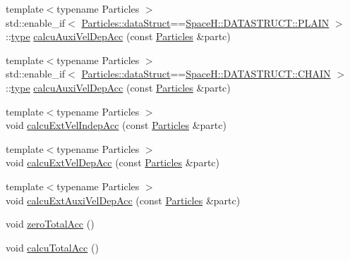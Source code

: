 \begin{DoxyCompactItemize}
\item 
{\footnotesize template$<$typename Particles $>$ }\\std\+::enable\+\_\+if$<$ \mbox{\hyperlink{class_vel_indep_particles_a6d357b21c216a2b079b1927c18de0b8f}{Particles\+::data\+Struct}}==\mbox{\hyperlink{namespace_space_h_a0af19f79a6498e99dbda772053d44a72af62eb0bf5e5c72e80983fbbac1cb70e5}{Space\+H\+::\+D\+A\+T\+A\+S\+T\+R\+U\+C\+T\+::\+P\+L\+A\+IN}} $>$\+::\mbox{\hyperlink{class_space_h_1_1_interaction_a0bed18b8b8efcb42be264a255f931be6}{type}} \mbox{\hyperlink{class_space_h_1_1_interaction_ae5763f03d500bc392c44d48cf87fe6fb}{calcu\+Auxi\+Vel\+Dep\+Acc}} (const \mbox{\hyperlink{struct_particles}{Particles}} \&partc)
\item 
{\footnotesize template$<$typename Particles $>$ }\\std\+::enable\+\_\+if$<$ \mbox{\hyperlink{class_vel_indep_particles_a6d357b21c216a2b079b1927c18de0b8f}{Particles\+::data\+Struct}}==\mbox{\hyperlink{namespace_space_h_a0af19f79a6498e99dbda772053d44a72a014d2cf3cdc3af6f4f92c09190860e33}{Space\+H\+::\+D\+A\+T\+A\+S\+T\+R\+U\+C\+T\+::\+C\+H\+A\+IN}} $>$\+::\mbox{\hyperlink{class_space_h_1_1_interaction_a0bed18b8b8efcb42be264a255f931be6}{type}} \mbox{\hyperlink{class_space_h_1_1_interaction_addc5bcf2c12d28945af7c78a464b599e}{calcu\+Auxi\+Vel\+Dep\+Acc}} (const \mbox{\hyperlink{struct_particles}{Particles}} \&partc)
\item 
{\footnotesize template$<$typename Particles $>$ }\\void \mbox{\hyperlink{class_space_h_1_1_interaction_a1121ca910c3c919b9239ed57ecb79440}{calcu\+Ext\+Vel\+Indep\+Acc}} (const \mbox{\hyperlink{struct_particles}{Particles}} \&partc)
\item 
{\footnotesize template$<$typename Particles $>$ }\\void \mbox{\hyperlink{class_space_h_1_1_interaction_a171fc6ed61d1e4d842df56d150c5d2ca}{calcu\+Ext\+Vel\+Dep\+Acc}} (const \mbox{\hyperlink{struct_particles}{Particles}} \&partc)
\item 
{\footnotesize template$<$typename Particles $>$ }\\void \mbox{\hyperlink{class_space_h_1_1_interaction_a29ebcdb5fb80bea1f0bc2de302a6cb15}{calcu\+Ext\+Auxi\+Vel\+Dep\+Acc}} (const \mbox{\hyperlink{struct_particles}{Particles}} \&partc)
\item 
void \mbox{\hyperlink{class_space_h_1_1_interaction_a000918130269445ac83b2df6243add07}{zero\+Total\+Acc}} ()
\item 
void \mbox{\hyperlink{class_space_h_1_1_interaction_a28a437fd17fe9b6190ca5aa321264c13}{calcu\+Total\+Acc}} ()
\end{DoxyCompactItemize}
